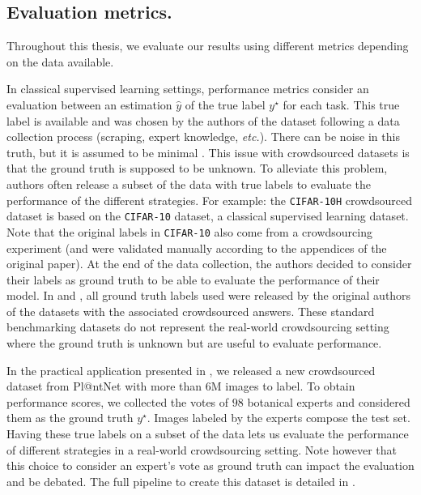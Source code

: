 \subsection{Evaluation metrics.}
\label{sub:evaluation-metrics}
Throughout this thesis, we evaluate our results using different metrics depending on the data available.

In classical supervised learning settings, performance metrics consider an evaluation between an estimation $\hat y$ of the true label $y^\star$ for each task.
This true label is available and was chosen by the authors of the dataset following a data collection process (scraping, expert knowledge, \emph{etc.}).
There can be noise in this truth, but it is assumed to be minimal \citep{northcutt_confident_2021}.
This issue with crowdsourced datasets is that the ground truth is supposed to be unknown.
To alleviate this problem, authors often release a subset of the data with true labels to evaluate the performance of the different strategies.
For example: the \texttt{CIFAR-10H} \citep{peterson_human_2019} crowdsourced dataset is based on the \texttt{CIFAR-10} dataset, a classical supervised learning dataset. Note that the original labels in \texttt{CIFAR-10} also come from a crowdsourcing experiment (and were validated manually according to the appendices of the original paper). At the end of the data collection, the authors decided to consider their labels as ground truth to be able to evaluate the performance of their model.
In  and , all ground truth labels used were released by the original authors of the datasets with the associated crowdsourced answers.
These standard benchmarking datasets do not represent the real-world crowdsourcing setting where the ground truth is unknown but are useful to evaluate performance.

In the practical application presented in , we released a new crowdsourced dataset from Pl@ntNet with more than $6$M images to label.
To obtain performance scores, we collected the votes of $98$ botanical experts and considered them as the ground truth $y^\star$.
Images labeled by the experts compose the test set.
Having these true labels on a subset of the data lets us evaluate the performance of different strategies in a real-world crowdsourcing setting.
Note however that this choice to consider an expert's vote as ground truth can impact the evaluation and be debated.
The full pipeline to create this dataset is detailed in .

